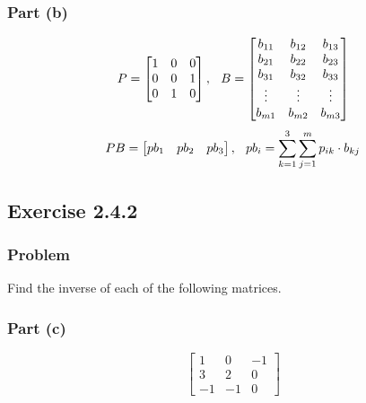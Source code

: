 \documentclass[12pt]{article}
\begin{document}
\subsubsection*{Part (b)}
\[
  P = 
  \begin{bmatrix}
    1 & 0 & 0\\ 
    0 & 0 & 1\\ 
    0 & 1 & 0 
  \end{bmatrix}, \hspace{0.1in}
  B = 
  \begin{bmatrix}
    b_{11} & b_{12} & b_{13}\\ 
    b_{21} & b_{22} & b_{23}\\ 
    b_{31} & b_{32} & b_{33} \\ 
    \vdots & \vdots & \vdots\\ 
    b_{m1} & b_{m2} & b_{m3} 
  \end{bmatrix}
\]
\[
  PB = 
  \begin{bmatrix}
    pb_1 & pb_2 & pb_3 
  \end{bmatrix}, \hspace{0.1in}
  pb_i = \displaystyle\sum_{k = 1}^{3}\displaystyle\sum_{j = 1}^{m} p_{ik} \cdot b_{kj}
\]
\vspace{2in}
\subsection*{Exercise 2.4.2}
\vspace{0.25in}
\subsubsection*{Problem}
Find the inverse of each of the following matrices. 
\vspace{0.25in}
\subsubsection*{Part (c)}
\[
  \begin{bmatrix}
    1 & 0 & -1\\ 
    3 & 2 & 0\\ 
    -1 & -1 & 0 
  \end{bmatrix}
\]
\end{document}
